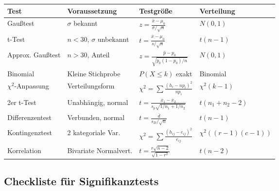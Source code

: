 \documentclass[10pt, a4paper, ngerman]{scrartcl}
\begin{document}
{\small
\begin{longtable}{|m{2cm}|m{2.5cm}|m{2.5cm}|m{3cm}|}
  \hline
  \textbf{Test} & \textbf{Voraussetzung} & \textbf{Testgröße} & \textbf{Verteilung} \\
  \hline
  \endhead
  
  Gaußtest & $\sigma$ bekannt & $z = \frac{\overline{x}-\mu_0}{\sigma/\sqrt{n}}$ & $N(0,1)$ \\
  \hline
  t-Test & $n < 30$, $\sigma$ unbekannt & $t = \frac{\overline{x}-\mu_0}{s/\sqrt{n}}$ & $t(n-1)$ \\
  \hline
  Approx. Gaußtest & $n > 30$, Anteil & $z = \frac{\hat{p}-p_0}{\sqrt{p_0(1-p_0)/n}}$ & $N(0,1)$ \\
  \hline
  Binomial & Kleine Stichprobe & $P(X \leq k)$ exakt & Binomial \\
  \hline
  $\chi^2$-Anpassung & Verteilungsform & $\chi^2 = \sum\frac{(h_i-np_i)^2}{np_i}$ & $\chi^2(k-1)$ \\
  \hline
  2er t-Test & Unabhängig, normal & $t = \frac{\overline{x}_1-\overline{x}_2}{s_p\sqrt{1/n_1+1/n_2}}$ & $t(n_1+n_2-2)$ \\
  \hline
  Differenzentest & Verbunden, normal & $t = \frac{\overline{d}}{s_D/\sqrt{n}}$ & $t(n-1)$ \\
  \hline
  Kontingenztest & 2 kategoriale Var. & $\chi^2 = \sum\frac{(h_{ij}-e_{ij})^2}{e_{ij}}$ & $\chi^2((r-1)(c-1))$ \\
  \hline
  Korrelation & Bivariate Normalvert. & $t = \frac{r\sqrt{n-2}}{\sqrt{1-r^2}}$ & $t(n-2)$ \\
  \hline
\end{longtable}
}

\subsection{Checkliste für Signifikanztests}
\end{document}

